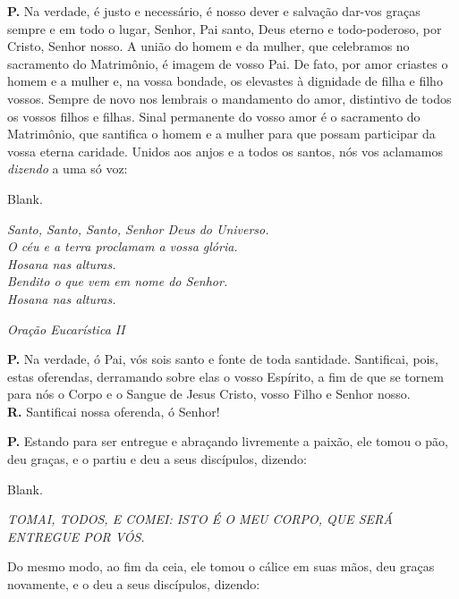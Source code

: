 \documentclass[a5paper,9pt]{memoir}
\begin{document}
{\textbf{P.} Na verdade, \'e justo e necess\'ario, \'e nosso dever e salva\c c\~ao dar-vos gra\c cas sempre e em todo o lugar, Senhor, Pai santo, Deus eterno e todo-poderoso, por Cristo, Senhor nosso. A uni\~ao do homem e da mulher, que celebramos no sacramento do Matrim\^onio, \'e imagem de vosso Pai. De fato, por amor criastes o homem e a mulher e, na vossa bondade, os elevastes \`a dignidade de filha e filho vossos. Sempre de novo nos lembrais o mandamento do amor, distintivo de todos os vossos filhos e filhas. Sinal permanente do vosso amor \'e o sacramento do Matrim\^onio, que santifica o homem e a mulher para que possam participar da vossa eterna caridade. Unidos aos anjos e a todos os santos, n\'os vos aclamamos {\itshape dizendo} a uma s\'o voz:

\begin{paracol}{2}
{\color{white}Blank.}

\switchcolumn

\itshape
Santo, Santo, Santo, Senhor Deus do Universo.\\
O céu e a terra proclamam a vossa glória.\\
Hosana nas alturas.\\
Bendito o que vem em nome do Senhor.\\
Hosana nas alturas.
\end{paracol}

\hfill {\itshape \color{mygray} Oração Eucarística II}

\textbf{P.} Na verdade, \'o Pai, v\'os sois santo e fonte de toda santidade. Santificai, pois, estas oferendas, derramando sobre elas o vos\-so Es\-p\'irito, a fim de que se tornem para n\'os o Corpo e {\itshape \color{mygray}\CrossMaltese} o Sangue de Jesus Cristo, vosso Filho e Senhor nosso.\\
\textbf{R.} Santificai nossa oferenda, \'o Senhor!

\textbf{P.} Estando para ser entregue e abra\c cando livremente a paix\~ao, ele tomou o p\~ao, deu gra\c cas, e o partiu e deu a seus disc\'ipulos, dizendo:

\begin{paracol}{2}
{\color{white}Blank.}

\switchcolumn

\itshape
TOMAI, TODOS, E COMEI: ISTO É O MEU COR\-PO, QUE SERÁ ENTREGUE POR VÓS.
\end{paracol}

Do mesmo modo, ao fim da ceia, ele tomou o cálice em suas mãos, deu graças novamente, e o deu a seus discípulos, dizendo:

}
\end{document}
